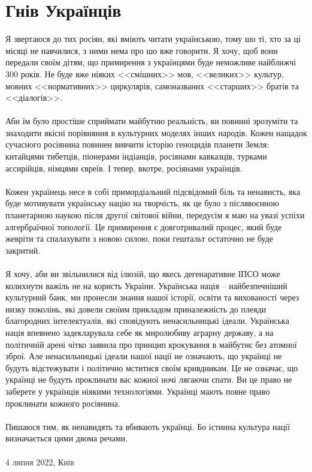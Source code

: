 \section{Гнів Українців}

Я звертаюся до тих росіян, які вміють читати українською,
тому шо ті, хто за ці місяці не навчилися, з ними нема про
шо вже говорити. Я хочу, щоб вони передали своїм дітям, що
примирення з українцями буде неможливе найближчі 300 років.
Не буде вже ніяких <<смішних>> мов, <<великих>> культур,
мовних <<нормативних>> циркулярів, самоназваних <<старших>>
братів та <<діалогів>>.
\\
\\
Аби їм було простіше сприймати майбутню реальність, ви повинні
зрозуміти та знаходити якісні порівняння в культурних моделях
інших народів. Кожен нащадок сучасного росіянина повинен
вивчити історію геноцидів планети Земля: китайцями тибетців,
піонерами індіанців, росіянами кавказців, турками ассирійців,
німцями євреїв. І тепер, вкотре, росіянами українців.
\\
\\
Кожен українець несе в собі примордіальний підсвідомий біль
та ненависть, яка буде мотивувати українську націю на творчість,
як це було з післявоєнною планетарною наукою після другої світової
війни, передусім я маю на увазі успіхи алгербраїчної топології.
Це примирення є довготривалий процес, який буде жевріти та
спалахувати з новою силою, поки гештальт остаточно не буде закритий.
\\
\\
Я хочу, аби ви звільнилися від ілюзій, що якесь дегенаративне ІПСО
може колихнути важіль не на користь України. Українська нація
-- найбезпечніший культурний банк, ми пронесли знання нашої історії,
освіти та вихованості через низку поколінь, які довели своїим
прикладом приналежність до плеяди благородних інтелектуалів,
які сповідують ненасильницькі ідеали. Українська нація впевнено
задекларувала себе як миролюбиву аграрну державу, а на політичній
арені чітко заявила про принцип крокування в майбутнє без атомної
зброї. Але ненасильницькі ідеали нашої нації не означають, що
українці не будуть відстежувати і політично мститися своїм
кривдникам. Це не означає, що українці не будуть проклинати вас
кожної ночі лягаючи спати. Ви це право не заберете у українців
ніякими технологіями. Українці мають повне право проклинати
кожного росіянина.
\\
\\
Пишаюся тим, як ненавидять та вбивають українці.
Бо істинна культура нації визначається цими двома речами.
\\
\\
\textsc{\footnotesize 4 липня 2022, Київ}

\normalsize
